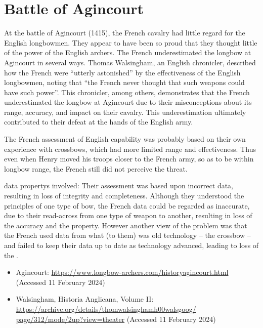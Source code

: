 \section{Battle of Agincourt}\label{bkm:incacc:agincourt}
  At the battle of Agincourt (1415), the French cavalry had little regard for the English longbowmen.
  They appear to have been so proud that they thought little of the power of the English
  archers.
  The French underestimated the longbow at Agincourt in several ways.
  Thomas Walsingham, an English chronicler, described how the French were ``utterly astonished''
  by the effectiveness of the English longbowmen,
  noting that ``the French never thought that such weapons could have such power''.
  This chronicler, among others, demonstrates that the French underestimated the longbow at
  Agincourt due to their misconceptions about its range, \gls{accuracy}, and impact on their cavalry.
  This underestimation ultimately contributed to their defeat at the hands of the English army.

  The French assessment of English capability was probably based on their own experience with
  crossbows, which had more limited range and effectiveness. Thus even when Henry moved his troops
  closer to the French army, so as to be within longbow range, the French still did not perceive the threat.

  \Glspl{data property} involved: Their assessment was based upon incorrect data, resulting in loss of 
  \gls{integrity} and
  \gls{completeness}.
  Although they understood the principles of one type of bow, the French data could be regarded as
  inaccurate, due to their read-across from one type of weapon to another, resulting in loss of the
  \gls{accuracy} and the
   property.
  However another view of the problem was that the French used data from what (to them) was old
  technology -- the crossbow -- and failed to keep their data up to date as technology advanced,
  leading to loss of the
  .

  \begin{itemize}
  \item Agincourt:
  \href{https://www.longbow-archers.com/historyagincourt.html}
       {https://www.longbow-archers.com/historyagincourt.html}
       (Accessed 11 February 2024)
  \item Walsingham, Historia Anglicana, Volume II:
  \href{https://archive.org/details/thomwalsinghamh00walsgoog/page/312/mode/2up?view=theater}
       {https://archive.org/details/thomwalsinghamh00walsgoog/ page/312/mode/2up?view=theater}
       (Accessed 11 February 2024)

\end{itemize}

